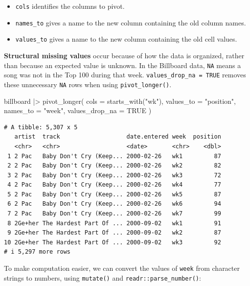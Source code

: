 \documentclass[
  letterpaper,
  DIV=11,
  numbers=noendperiod]{scrreprt}
\newenvironment{Shaded}{\begin{snugshade}}{\end{snugshade}}
\newcommand{\AttributeTok}[1]{\textcolor[rgb]{0.40,0.45,0.13}{#1}}
\newcommand{\ConstantTok}[1]{\textcolor[rgb]{0.56,0.35,0.01}{#1}}
\newcommand{\FunctionTok}[1]{\textcolor[rgb]{0.28,0.35,0.67}{#1}}
\newcommand{\NormalTok}[1]{\textcolor[rgb]{0.00,0.23,0.31}{#1}}
\newcommand{\SpecialCharTok}[1]{\textcolor[rgb]{0.37,0.37,0.37}{#1}}
\newcommand{\StringTok}[1]{\textcolor[rgb]{0.13,0.47,0.30}{#1}}
\providecommand{\tightlist}{%
  \setlength{\itemsep}{0pt}\setlength{\parskip}{0pt}}
\begin{document}
\begin{itemize}
\tightlist
\item
  \texttt{cols} identifies the columns to pivot.
\item
  \texttt{names\_to} gives a name to the new column containing the old
  column names.
\item
  \texttt{values\_to} gives a name to the new column containing the old
  cell values.
\end{itemize}

\textbf{Structural missing values} occur because of how the data is
organized, rather than because an expected value is unknown. In the
Billboard data, \texttt{NA} means a song was not in the Top 100 during
that week. \texttt{values\_drop\_na\ =\ TRUE} removes these unnecessary
\texttt{NA} rows when using \texttt{pivot\_longer()}.

\begin{Shaded}
\begin{Highlighting}[]
\NormalTok{billboard }\SpecialCharTok{|\textgreater{}}
  \FunctionTok{pivot\_longer}\NormalTok{(}
    \AttributeTok{cols =} \FunctionTok{starts\_with}\NormalTok{(}\StringTok{"wk"}\NormalTok{),}
    \AttributeTok{values\_to =} \StringTok{"position"}\NormalTok{,}
    \AttributeTok{names\_to =} \StringTok{"week"}\NormalTok{,}
    \AttributeTok{values\_drop\_na =} \ConstantTok{TRUE}
\NormalTok{  )}
\end{Highlighting}
\end{Shaded}

\begin{verbatim}
# A tibble: 5,307 x 5
   artist  track                   date.entered week  position
   <chr>   <chr>                   <date>       <chr>    <dbl>
 1 2 Pac   Baby Don't Cry (Keep... 2000-02-26   wk1         87
 2 2 Pac   Baby Don't Cry (Keep... 2000-02-26   wk2         82
 3 2 Pac   Baby Don't Cry (Keep... 2000-02-26   wk3         72
 4 2 Pac   Baby Don't Cry (Keep... 2000-02-26   wk4         77
 5 2 Pac   Baby Don't Cry (Keep... 2000-02-26   wk5         87
 6 2 Pac   Baby Don't Cry (Keep... 2000-02-26   wk6         94
 7 2 Pac   Baby Don't Cry (Keep... 2000-02-26   wk7         99
 8 2Ge+her The Hardest Part Of ... 2000-09-02   wk1         91
 9 2Ge+her The Hardest Part Of ... 2000-09-02   wk2         87
10 2Ge+her The Hardest Part Of ... 2000-09-02   wk3         92
# i 5,297 more rows
\end{verbatim}

To make computation easier, we can convert the values of \texttt{week}
from character strings to numbers, using \texttt{mutate()} and
\texttt{readr::parse\_number()}:
\end{document}
